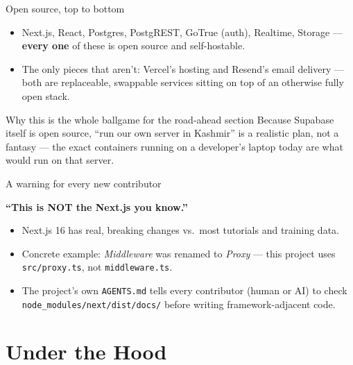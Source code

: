 \documentclass[aspectratio=169,11pt]{beamer}
\newcommand{\code}[1]{\textcolor{olkTealDark}{\texttt{#1}}}
\begin{document}
\begin{frame}{Open source, top to bottom}
  \begin{itemize}
    \item Next.js, React, Postgres, PostgREST, GoTrue (auth), Realtime, Storage --- \textbf{every one} of these is open source and self-hostable.
    \item The only pieces that aren't: Vercel's hosting and Resend's email delivery --- both are replaceable, swappable services sitting on top of an otherwise fully open stack.
  \end{itemize}
  \vfill
  \begin{alertblock}{Why this is the whole ballgame for the road-ahead section}
    Because Supabase itself is open source, ``run our own server in Kashmir'' is a realistic plan, not a fantasy --- the exact containers running on a developer's laptop today are what would run on that server.
  \end{alertblock}
\end{frame}

\begin{frame}{A warning for every new contributor}
  \begin{center}
    \Large\textbf{``This is NOT the Next.js you know.''}
  \end{center}
  \vspace{6pt}
  \begin{itemize}
    \item Next.js 16 has real, breaking changes vs.\ most tutorials and training data.
    \item Concrete example: \emph{Middleware} was renamed to \emph{Proxy} --- this project uses \code{src/proxy.ts}, not \code{middleware.ts}.
    \item The project's own \code{AGENTS.md} tells every contributor (human or AI) to check \code{node\_modules/next/dist/docs/} before writing framework-adjacent code.
  \end{itemize}
\end{frame}

\section{Under the Hood}
\end{document}
